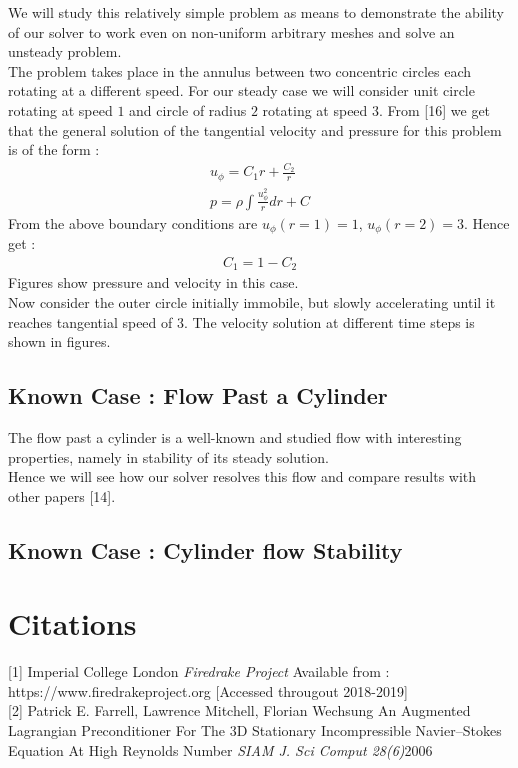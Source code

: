 \documentclass[11pt,twoside,a4paper]{article}
\begin{document}
We will study this relatively simple problem as means to demonstrate the ability of our solver to work even on non-uniform arbitrary meshes and solve an unsteady problem.\\
The problem takes place in the annulus between two concentric circles each rotating at a different speed. For our steady case we will consider unit circle rotating at speed $1$ and circle of radius $2$ rotating at speed $3$. 
From [16] we get that the general solution of the tangential velocity and pressure for this problem is of the form :
\begin{align}
u_{\phi} = C_1 r + \frac{C_2}{r} \\
p = \rho \int \frac{u_{\phi}^2}{r} dr + C
\end{align}
From the above boundary conditions are $u_{\phi}(r=1) = 1$, $u_{\phi}(r=2) = 3$. Hence get :
\begin{align*}
C_1 = 1 - C_2 
\end{align*}
Figures show pressure and velocity in this case.\\

Now consider the outer circle initially immobile, but slowly accelerating until it reaches tangential speed of $3$. The velocity solution at different time steps is shown in figures.

\subsection{Known Case : Flow Past a Cylinder}

The flow past a cylinder is a well-known and studied flow with interesting properties, namely in stability of its steady solution.\\
Hence we will see how our solver resolves this flow and compare results with other papers [14].

\subsection{Known Case : Cylinder flow Stability}
\section{Citations}

[1] Imperial College London \textit{Firedrake Project} Available from : https://www.firedrakeproject.org [Accessed througout 2018-2019]\\

[2] Patrick E. Farrell, Lawrence Mitchell, Florian Wechsung
 An Augmented Lagrangian Preconditioner For The 3D Stationary Incompressible Navier–Stokes Equation At High Reynolds Number
\textit{SIAM J. Sci Comput 28(6)}2006\\
\end{document}
